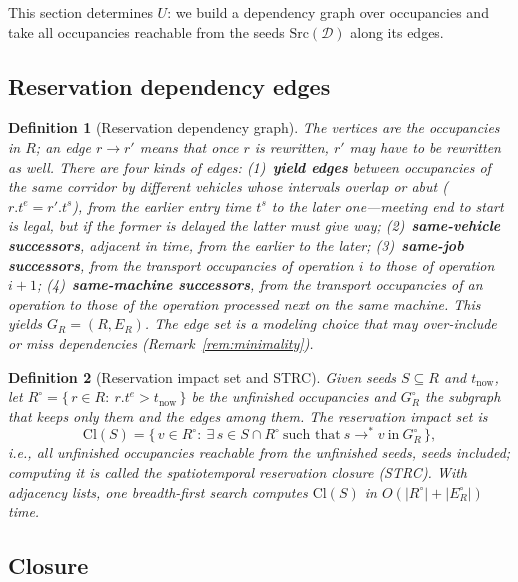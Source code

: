\documentclass[manuscript,screen,review]{acmart}
\providecommand{\STRC}{\textsc{STRC}}
\newtheorem{definition}{Definition}
\begin{document}
This section determines \(U\): we build a dependency graph over occupancies and take all occupancies reachable from the seeds \(\mathrm{Src}(\mathcal{D})\) along its edges.

\subsection{Reservation dependency edges}
\label{sec:closure_def}

\begin{definition}[Reservation dependency graph]
\label{def:dep}
The vertices are the occupancies in \(R\); an edge \(r\to r'\) means that once \(r\) is rewritten, \(r'\) may have to be rewritten as well. There are four kinds of edges:
(1)~\textbf{yield edges} between occupancies of the same corridor by different vehicles whose intervals overlap \emph{or abut} (\(r.t^e=r'.t^s\)), from the earlier entry time \(t^s\) to the later one---meeting end to start is legal, but if the former is delayed the latter must give way;
(2)~\textbf{same-vehicle successors}, adjacent in time, from the earlier to the later;
(3)~\textbf{same-job successors}, from the transport occupancies of operation \(i\) to those of operation \(i+1\);
(4)~\textbf{same-machine successors}, from the transport occupancies of an operation to those of the operation processed next on the same machine.
This yields \(G_R=(R,E_R)\). The edge set is a modeling choice that may over-include or miss dependencies (Remark~\ref{rem:minimality}).
\end{definition}

\begin{definition}[Reservation impact set and \STRC{}]
\label{def:strc}
Given seeds \(S\subseteq R\) and \(t_{\mathrm{now}}\), let \(R^{\circ}=\{\,r\in R:\ r.t^e>t_{\mathrm{now}}\,\}\) be the unfinished occupancies and \(G_R^\circ\) the subgraph that keeps only them and the edges among them.
The reservation impact set is
\[
\mathrm{Cl}(S)=\bigl\{\,v\in R^{\circ}:\ \exists\,s\in S\cap R^{\circ}\ \text{such that}\ s\!\to^*\!v\ \text{in}\ G_R^\circ\,\bigr\},
\]
i.e., all unfinished occupancies reachable from the unfinished seeds, seeds included; computing it is called the spatiotemporal reservation closure (\STRC).
With adjacency lists, one breadth-first search computes \(\mathrm{Cl}(S)\) in \(O(|R^{\circ}|+|E_R^{\circ}|)\) time.
\end{definition}

\subsection{Closure}
\label{sec:containment}
\end{document}
